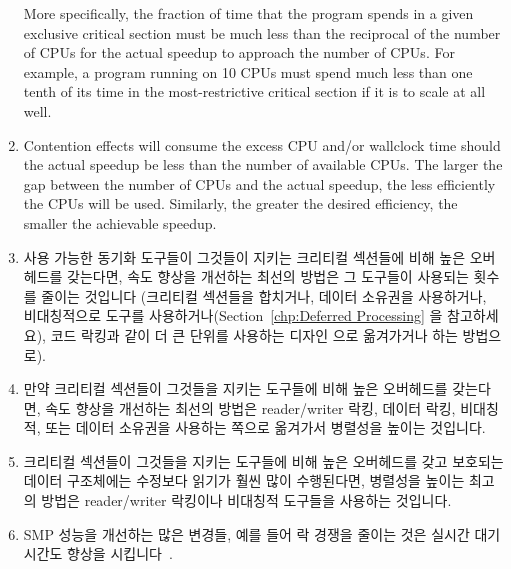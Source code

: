 \begin{enumerate}
	More specifically, the fraction of time that the program spends in
	a given exclusive critical section must be much less than
	the reciprocal of the number of CPUs for the
	actual speedup to approach the number of CPUs.
	For example, a program running on 10 CPUs must spend
	much less than one tenth of its time in the most-restrictive
	critical section if it is to scale at all well.
\item	Contention effects will consume the excess CPU and/or
	wallclock time should the actual speedup be less than
	the number of available CPUs.  The
	larger the gap between the number of CPUs
	and the actual speedup, the less efficiently the
	CPUs will be used.
	Similarly, the greater the desired efficiency, the smaller
	the achievable speedup.
\fi
\item	사용 가능한 동기화 도구들이 그것들이 지키는 크리티컬 섹션들에 비해 높은
	오버헤드를 갖는다면, 속도 향상을 개선하는 최선의 방법은 그 도구들이
	사용되는 횟수를 줄이는 것입니다 (크리티컬 섹션들을 합치거나, 데이터
	소유권을 사용하거나, 비대칭적으로 도구를
	사용하거나(Section~\ref{chp:Deferred Processing} 을 참고하세요), 코드
	락킹과 같이 더 큰 단위를 사용하는 디자인 으로 옮겨가거나 하는
	방법으로).
\item	만약 크리티컬 섹션들이 그것들을 지키는 도구들에 비해 높은 오버헤드를
	갖는다면, 속도 향상을 개선하는 최선의 방법은 reader/writer 락킹, 데이터
	락킹, 비대칭적, 또는 데이터 소유권을 사용하는 쪽으로 옮겨가서 병렬성을
	높이는 것입니다.
\item	크리티컬 섹션들이 그것들을 지키는 도구들에 비해 높은 오버헤드를 갖고
	보호되는 데이터 구조체에는 수정보다 읽기가 훨씬 많이 수행된다면,
	병렬성을 높이는 최고의 방법은 reader/writer 락킹이나 비대칭적 도구들을
	사용하는 것입니다.
\item	SMP 성능을 개선하는 많은 변경들, 예를 들어 락 경쟁을 줄이는 것은 실시간
	대기시간도 향상을 시킵니다~\cite{PaulMcKenney2005h}.
\iffalse

\item	If the available synchronization primitives have
	high overhead compared to the critical sections
	that they guard, the best way to improve speedup
	is to reduce the number of times that the primitives
	are invoked (perhaps by batching critical sections,
	using data ownership, using asymmetric primitives
	(see Section~\ref{chp:Deferred Processing}),
	or by moving toward a more coarse-grained design
	such as code locking).
\item	If the critical sections have high overhead compared
	to the primitives guarding them, the best way
	to improve speedup is to increase parallelism
	by moving to reader/writer locking, data locking, asymmetric,
	or data ownership.
\item	If the critical sections have high overhead compared
	to the primitives guarding them and the data structure
	being guarded is read much more often than modified,
	the best way to increase parallelism is to move
	to reader/writer locking or asymmetric primitives.
\item	Many changes that improve SMP performance, for example,
	reducing lock contention, also improve real-time
	latencies~\cite{PaulMcKenney2005h}.
\fi
\end{enumerate}

